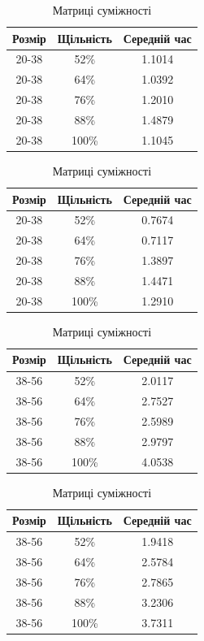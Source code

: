 \documentclass[12pt, letterpaper, twoside]{article}
\begin{document}
\begin{table}[htbp]
\begin{minipage}[b]{0.5\linewidth}
\begin{tabular}{|c|c|c|}
\hline
Розмір & Щільність & Середній час\\
\hline
20-38 & 52\% & 1.1014 \\
20-38 & 64\% & 1.0392 \\
20-38 & 76\% & 1.2010 \\
20-38 & 88\% & 1.4879 \\
20-38 & 100\% & 1.1045 \\
\hline
\end{tabular}
\caption{Списки суміжності}
\end{minipage}
\begin{minipage}[b]{0.5\linewidth}
\begin{tabular}{|c|c|c|}
\hline
Розмір & Щільність & Середній час\\
\hline
20-38 & 52\% & 0.7674 \\
20-38 & 64\% & 0.7117 \\
20-38 & 76\% & 1.3897 \\
20-38 & 88\% & 1.4471 \\
20-38 & 100\% & 1.2910 \\
\hline
\end{tabular}
\caption{Матриці суміжності}
\end{minipage}
\end{table}
\begin{table}[htbp]
\begin{minipage}[b]{0.5\linewidth}
\begin{tabular}{|c|c|c|}
\hline
Розмір & Щільність & Середній час\\
\hline
38-56 & 52\% & 2.0117 \\
38-56 & 64\% & 2.7527 \\
38-56 & 76\% & 2.5989 \\
38-56 & 88\% & 2.9797 \\
38-56 & 100\% & 4.0538 \\
\hline
\end{tabular}
\caption{Списки суміжності}
\end{minipage}
\begin{minipage}[b]{0.5\linewidth}
\begin{tabular}{|c|c|c|}
\hline
Розмір & Щільність & Середній час\\
\hline
38-56 & 52\% & 1.9418 \\
38-56 & 64\% & 2.5784 \\
38-56 & 76\% & 2.7865 \\
38-56 & 88\% & 3.2306 \\
38-56 & 100\% & 3.7311 \\
\hline
\end{tabular}
\caption{Матриці суміжності}
\end{minipage}
\end{table}
\end{document}
